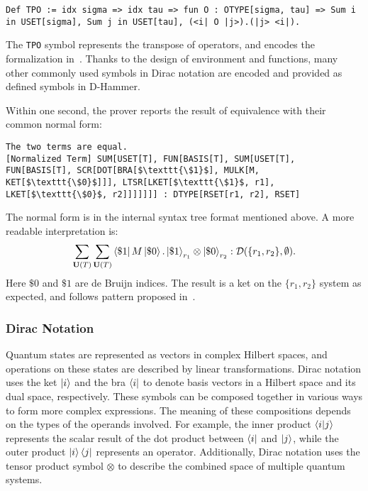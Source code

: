 \begin{lstlisting}[style=dhammer]
Def TPO := idx sigma => idx tau => fun O : OTYPE[sigma, tau] => Sum i in USET[sigma], Sum j in USET[tau], (<i| O |j>).(|j> <i|).
\end{lstlisting}

The \texttt{TPO} symbol represents the transpose of operators, and encodes the formalization in~. Thanks to the design of environment and functions, many other commonly used symbols in Dirac notation are encoded and provided as defined symbols in D-Hammer.

Within one second, the prover reports the result of equivalence with their common normal form:
    \begin{lstlisting}[style=dhammer]
The two terms are equal.
[Normalized Term] SUM[USET[T], FUN[BASIS[T], SUM[USET[T], FUN[BASIS[T], SCR[DOT[BRA[$\texttt{\$1}$], MULK[M, KET[$\texttt{\$0}$]]], LTSR[LKET[$\texttt{\$1}$, r1], LKET[$\texttt{\$0}$, r2]]]]]]] : DTYPE[RSET[r1, r2], RSET]
    \end{lstlisting}

The normal form is in the internal syntax tree format mentioned above. A more readable interpretation is:
\[
\sum_{\mathbf{U}(T)} \sum_{\mathbf{U}(T)} \bra{\$1}M\ket{\$ 0} . \ket{\$1}_{r_1} \otimes \ket{\$0}_{r_2} : \mathcal{D}(\{r_1, r_2\}, \emptyset).
\]
Here $\$0$ and $\$1$ are de Bruijn indices. The result is a ket on the $\{r_1, r_2\}$ system as expected, and follows pattern proposed in~.




\subsubsection{Dirac Notation}

Quantum states are represented as vectors in complex Hilbert spaces, and operations on these states are described by linear transformations. Dirac notation uses the ket \( \ket{i} \) and the bra \( \bra{i} \) to denote basis vectors in a Hilbert space and its dual space, respectively. These symbols can be composed together in various ways to form more complex expressions. The meaning of these compositions depends on the types of the operands involved.
For example, the inner product \( \braket{i|j} \) represents the scalar result of the dot product between \( \bra{i} \) and \( \ket{j} \), while the outer product \( \ket{i}\bra{j} \) represents an operator. Additionally, Dirac notation uses the tensor product symbol \( \otimes \) to describe the combined space of multiple quantum systems.

